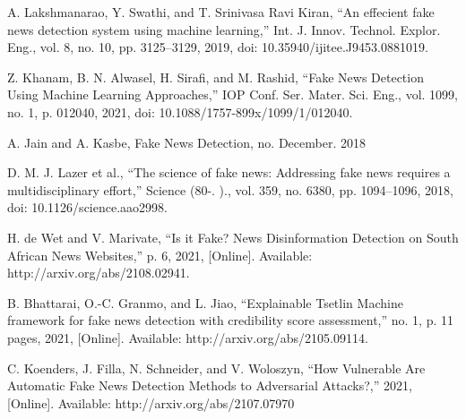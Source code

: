 \documentclass[conference]{IEEEtran}
\begin{document}
\begin{thebibliography}{00}
 A. Lakshmanarao, Y. Swathi, and T. Srinivasa Ravi Kiran, “An effecient fake news detection system using machine learning,” Int. J. Innov. Technol. Explor. Eng., vol. 8, no. 10, pp. 3125–3129, 2019, doi: 10.35940/ijitee.J9453.0881019.


\vspace{12pt}
 Z. Khanam, B. N. Alwasel, H. Sirafi, and M. Rashid, “Fake News Detection Using Machine Learning Approaches,” IOP Conf. Ser. Mater. Sci. Eng., vol. 1099, no. 1, p. 012040, 2021, doi: 10.1088/1757-899x/1099/1/012040.

\vspace{12pt}
 A. Jain and A. Kasbe, Fake News Detection, no. December. 2018


\vspace{12pt}
 D. M. J. Lazer et al., “The science of fake news: Addressing fake news requires a multidisciplinary effort,” Science (80-. )., vol. 359, no. 6380, pp. 1094–1096, 2018, doi: 10.1126/science.aao2998.


\vspace{12pt}
 H. de Wet and V. Marivate, “Is it Fake? News Disinformation Detection on South African News Websites,” p. 6, 2021, [Online]. Available: http://arxiv.org/abs/2108.02941.


\vspace{12pt}
 B. Bhattarai, O.-C. Granmo, and L. Jiao, “Explainable Tsetlin Machine framework for fake news detection with credibility score assessment,” no. 1, p. 11 pages, 2021, [Online]. Available: http://arxiv.org/abs/2105.09114.


\vspace{12pt}
 C. Koenders, J. Filla, N. Schneider, and V. Woloszyn, “How Vulnerable Are Automatic Fake News Detection Methods to Adversarial Attacks?,” 2021, [Online]. Available: http://arxiv.org/abs/2107.07970


\end{thebibliography}
\end{document}
